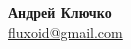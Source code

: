 \documentclass[12pt]{article}
\begin{document}
\setlength{\topskip}{0mm}
\setlength{\parindent}{0pt}
\setlength{\parskip}{5pt}
\raggedright
\raggedbottom
\large
{}

\textbf{Андрей Ключко}\\%
\href{mailto:fluxoid@gmail.com}{fluxoid@gmail.com}

\vspace{1em}
\end{document}
